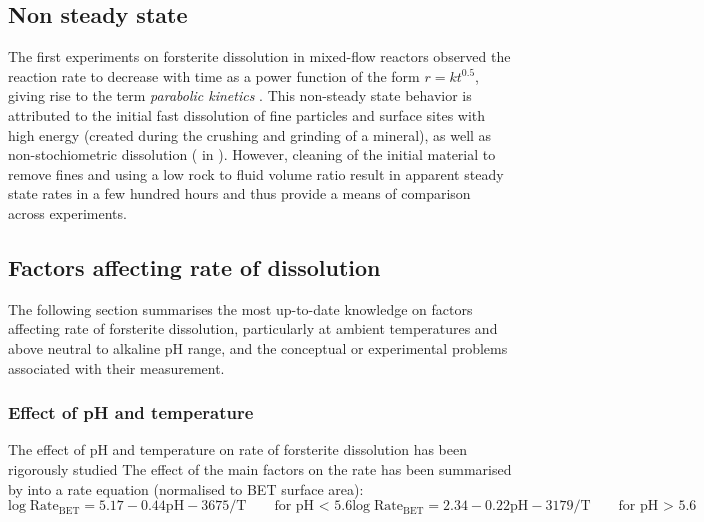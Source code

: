 \subsection{Non steady state}\label{subsec:nonsteadystate}
The first experiments on forsterite dissolution in mixed-flow reactors observed the reaction rate to decrease with time as a power function of the form $r=kt^{\text{0.5}}$\;\citep{luce1972,paces1973}, giving rise to the term \textit{parabolic kinetics} \citep{Brantley2008b}. This non-steady state behavior is attributed to the initial fast dissolution of fine particles and surface sites with high energy (created during the crushing and grinding of a mineral), as well as non-stochiometric dissolution (\cite{holdren1979} in \cite{Brantley2008b}). However, cleaning of the initial material to remove fines and using a low rock to fluid volume ratio result in apparent steady state rates in a few hundred hours and thus provide a means of comparison across experiments. 

\subsection{Factors affecting rate of dissolution }\label{subsec:factors}
The following section summarises the most up-to-date knowledge on factors affecting rate of forsterite dissolution, particularly at ambient temperatures and above neutral to alkaline pH range, and the conceptual or experimental problems associated with their measurement.  
\subsubsection{Effect of pH and temperature}
The effect of pH and temperature on rate of forsterite dissolution has been rigorously studied \citep{wogelius1991,wogelius1992,pokrovsky2000,rosso2000,oelkers2001a}
The effect of the main factors on the rate has been summarised by \cite{rimstidt2012} into a rate equation (normalised to BET surface area):
\begin{subequations}\label{eq:rimstidt}
\begin{equation}
\mathrm{log\;Rate_{BET} = 5.17-0.44pH-3675/T \qquad \text{for pH < 5.6}}
\end{equation}
\begin{equation}
\mathrm{log\;Rate_{BET} = 2.34-0.22pH-3179/T \qquad \text{for pH > 5.6}}
\end{equation}
\end{subequations}

